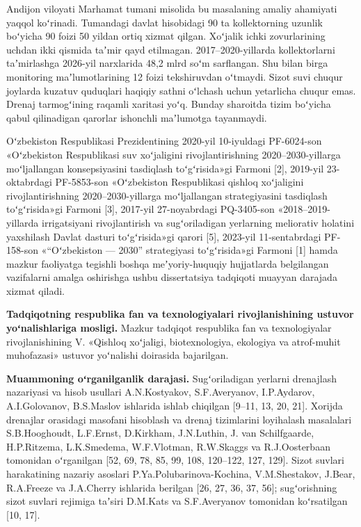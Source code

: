 Andijon viloyati Marhamat tumani misolida bu masalaning amaliy ahamiyati
yaqqol koʻrinadi. Tumandagi davlat hisobidagi 90 ta kollektorning
uzunlik boʻyicha 90 foizi 50 yildan ortiq xizmat qilgan. Xoʻjalik ichki
zovurlarining uchdan ikki qismida taʼmir qayd etilmagan.
2017--2020-yillarda kollektorlarni taʼmirlashga 2026-yil narxlarida 48,2
mlrd soʻm sarflangan. Shu bilan birga monitoring maʼlumotlarining 12
foizi tekshiruvdan oʻtmaydi. Sizot suvi chuqur joylarda kuzatuv
quduqlari haqiqiy sathni oʻlchash uchun yetarlicha chuqur emas. Drenaj
tarmogʻining raqamli xaritasi yoʻq. Bunday sharoitda tizim boʻyicha
qabul qilinadigan qarorlar ishonchli maʼlumotga tayanmaydi.

Oʻzbekiston Respublikasi Prezidentining 2020-yil 10-iyuldagi PF-6024-son
«Oʻzbekiston Respublikasi suv xoʻjaligini rivojlantirishning
2020--2030-yillarga moʻljallangan konsepsiyasini tasdiqlash
toʻgʻrisida»gi Farmoni {[}2{]}, 2019-yil 23-oktabrdagi PF-5853-son
«Oʻzbekiston Respublikasi qishloq xoʻjaligini rivojlantirishning
2020--2030-yillarga moʻljallangan strategiyasini tasdiqlash
toʻgʻrisida»gi Farmoni {[}3{]}, 2017-yil 27-noyabrdagi PQ-3405-son
«2018--2019-yillarda irrigatsiyani rivojlantirish va sugʻoriladigan
yerlarning meliorativ holatini yaxshilash Davlat dasturi toʻgʻrisida»gi
qarori {[}5{]}, 2023-yil 11-sentabrdagi PF-158-son «``Oʻzbekiston ---
2030'' strategiyasi toʻgʻrisida»gi Farmoni {[}1{]} hamda mazkur
faoliyatga tegishli boshqa meʼyoriy-huquqiy hujjatlarda belgilangan
vazifalarni amalga oshirishga ushbu dissertatsiya tadqiqoti muayyan
darajada xizmat qiladi.

\textbf{Tadqiqotning respublika fan va texnologiyalari rivojlanishining
ustuvor yoʻnalishlariga mosligi.} Mazkur tadqiqot respublika fan va
texnologiyalar rivojlanishining V. «Qishloq xoʻjaligi, biotexnologiya,
ekologiya va atrof-muhit muhofazasi» ustuvor yoʻnalishi doirasida
bajarilgan.

\textbf{Muammoning oʻrganilganlik darajasi.} Sugʻoriladigan yerlarni
drenajlash nazariyasi va hisob usullari A.N.Kostyakov, S.F.Averyanov,
I.P.Aydarov, A.I.Golovanov, B.S.Maslov ishlarida ishlab chiqilgan
{[}9--11, 13, 20, 21{]}. Xorijda drenajlar orasidagi masofani hisoblash
va drenaj tizimlarini loyihalash masalalari S.B.Hooghoudt, L.F.Ernst,
D.Kirkham, J.N.Luthin, J. van Schilfgaarde, H.P.Ritzema, L.K.Smedema,
W.F.Vlotman, R.W.Skaggs va R.J.Oosterbaan tomonidan oʻrganilgan {[}52,
69, 78, 85, 99, 108, 120--122, 127, 129{]}. Sizot suvlari harakatining
nazariy asoslari P.Ya.Polubarinova-Kochina, V.M.Shestakov, J.Bear,
R.A.Freeze va J.A.Cherry ishlarida berilgan {[}26, 27, 36, 37, 56{]};
sugʻorishning sizot suvlari rejimiga taʼsiri D.M.Kats va S.F.Averyanov
tomonidan koʻrsatilgan {[}10, 17{]}.

